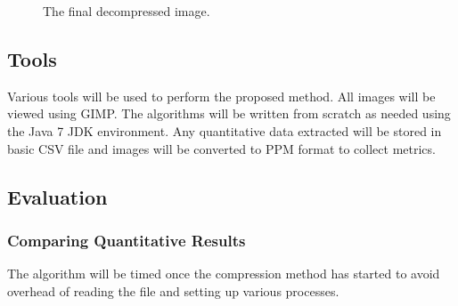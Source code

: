 \documentclass[12pt]{CPP}
\begin{document}
\begin{figure}[!htbp]
\begin{center}
\caption{The final decompressed image.}
\end{center}
\end{figure}

\subsection{Tools}
Various tools will be used to perform the proposed method. All images will be viewed using GIMP. The algorithms will be written from scratch as needed using the Java 7 JDK environment. Any quantitative data extracted will be stored in basic CSV file and images will be converted to PPM format to collect metrics.

\subsection{Evaluation}
\subsubsection{Comparing Quantitative Results}
The algorithm will be timed once the compression method has started to avoid overhead of reading the file and setting up various processes.
\end{document}
